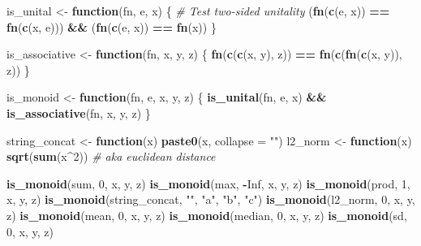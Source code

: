 \documentclass[
  openany]{book}
\newenvironment{Shaded}{\begin{snugshade}}{\end{snugshade}}
\newcommand{\AttributeTok}[1]{\textcolor[rgb]{0.13,0.29,0.53}{#1}}
\newcommand{\CommentTok}[1]{\textcolor[rgb]{0.56,0.35,0.01}{\textit{#1}}}
\newcommand{\ConstantTok}[1]{\textcolor[rgb]{0.56,0.35,0.01}{#1}}
\newcommand{\ControlFlowTok}[1]{\textcolor[rgb]{0.13,0.29,0.53}{\textbf{#1}}}
\newcommand{\DecValTok}[1]{\textcolor[rgb]{0.00,0.00,0.81}{#1}}
\newcommand{\FunctionTok}[1]{\textcolor[rgb]{0.13,0.29,0.53}{\textbf{#1}}}
\newcommand{\NormalTok}[1]{#1}
\newcommand{\OtherTok}[1]{\textcolor[rgb]{0.56,0.35,0.01}{#1}}
\newcommand{\SpecialCharTok}[1]{\textcolor[rgb]{0.81,0.36,0.00}{\textbf{#1}}}
\newcommand{\StringTok}[1]{\textcolor[rgb]{0.31,0.60,0.02}{#1}}
\theoremstyle{definition}
\theoremstyle{definition}
\theoremstyle{definition}
\theoremstyle{definition}
\theoremstyle{remark}
\begin{document}
\begin{Shaded}
\begin{Highlighting}[]
\NormalTok{is\_unital }\OtherTok{\textless{}{-}} \ControlFlowTok{function}\NormalTok{(fn, e, x) \{}
  \CommentTok{\# Test two{-}sided unitality}
\NormalTok{  (}\FunctionTok{fn}\NormalTok{(}\FunctionTok{c}\NormalTok{(e, x)) }\SpecialCharTok{==} \FunctionTok{fn}\NormalTok{(}\FunctionTok{c}\NormalTok{(x, e))) }\SpecialCharTok{\&\&}\NormalTok{ (}\FunctionTok{fn}\NormalTok{(}\FunctionTok{c}\NormalTok{(e, x)) }\SpecialCharTok{==} \FunctionTok{fn}\NormalTok{(x))}
\NormalTok{\}}

\NormalTok{is\_associative }\OtherTok{\textless{}{-}} \ControlFlowTok{function}\NormalTok{(fn, x, y, z) \{}
  \FunctionTok{fn}\NormalTok{(}\FunctionTok{c}\NormalTok{(}\FunctionTok{c}\NormalTok{(x, y), z)) }\SpecialCharTok{==} \FunctionTok{fn}\NormalTok{(}\FunctionTok{c}\NormalTok{(}\FunctionTok{fn}\NormalTok{(}\FunctionTok{c}\NormalTok{(x, y)), z))}
\NormalTok{\}}

\NormalTok{is\_monoid }\OtherTok{\textless{}{-}} \ControlFlowTok{function}\NormalTok{(fn, e, x, y, z) \{}
  \FunctionTok{is\_unital}\NormalTok{(fn, e, x) }\SpecialCharTok{\&\&} \FunctionTok{is\_associative}\NormalTok{(fn, x, y, z)}
\NormalTok{\}}

\NormalTok{string\_concat }\OtherTok{\textless{}{-}} \ControlFlowTok{function}\NormalTok{(x) }\FunctionTok{paste0}\NormalTok{(x, }\AttributeTok{collapse =} \StringTok{""}\NormalTok{)}
\NormalTok{l2\_norm }\OtherTok{\textless{}{-}} \ControlFlowTok{function}\NormalTok{(x) }\FunctionTok{sqrt}\NormalTok{(}\FunctionTok{sum}\NormalTok{(x}\SpecialCharTok{\^{}}\DecValTok{2}\NormalTok{)) }\CommentTok{\# aka euclidean distance}

\FunctionTok{is\_monoid}\NormalTok{(sum, }\DecValTok{0}\NormalTok{, x, y, z)}
\FunctionTok{is\_monoid}\NormalTok{(max, }\SpecialCharTok{{-}}\ConstantTok{Inf}\NormalTok{, x, y, z)}
\FunctionTok{is\_monoid}\NormalTok{(prod, }\DecValTok{1}\NormalTok{, x, y, z)}
\FunctionTok{is\_monoid}\NormalTok{(string\_concat, }\StringTok{""}\NormalTok{, }\StringTok{"a"}\NormalTok{, }\StringTok{"b"}\NormalTok{, }\StringTok{"c"}\NormalTok{)}
\FunctionTok{is\_monoid}\NormalTok{(l2\_norm, }\DecValTok{0}\NormalTok{, x, y, z)}
\FunctionTok{is\_monoid}\NormalTok{(mean, }\DecValTok{0}\NormalTok{, x, y, z)}
\FunctionTok{is\_monoid}\NormalTok{(median, }\DecValTok{0}\NormalTok{, x, y, z)}
\FunctionTok{is\_monoid}\NormalTok{(sd, }\DecValTok{0}\NormalTok{, x, y, z)}
\end{Highlighting}
\end{Shaded}
\end{document}
